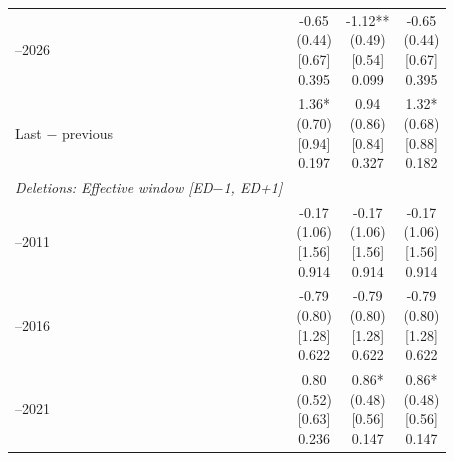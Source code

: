 \begin{threeparttable}
\begin{tabular}{@{}lccc}
\addlinespace[0.25ex]
\addlinespace[0.25ex]
2022–2026 & \makecell{-0.65\\(0.44)\\{}[0.67]\\{0.395}} & \makecell{-1.12**\\(0.49)\\{}[0.54]\\{0.099}} & \makecell{-0.65\\(0.44)\\{}[0.67]\\{0.395}} \\
\addlinespace[0.25ex]
\addlinespace[0.25ex]
Last $-$ previous & \makecell{1.36*\\(0.70)\\{}[0.94]\\{0.197}} & \makecell{0.94\\(0.86)\\{}[0.84]\\{0.327}} & \makecell{1.32*\\(0.68)\\{}[0.88]\\{0.182}} \\
\addlinespace[0.25ex]
\midrule
\emph{Deletions: Effective window [ED$-$1, ED+1]} \\
\addlinespace[0.25ex]
\addlinespace[1ex]
2007–2011 & \makecell{-0.17\\(1.06)\\{}[1.56]\\{0.914}} & \makecell{-0.17\\(1.06)\\{}[1.56]\\{0.914}} & \makecell{-0.17\\(1.06)\\{}[1.56]\\{0.914}} \\
\addlinespace[0.25ex]
\addlinespace[0.25ex]
2012–2016 & \makecell{-0.79\\(0.80)\\{}[1.28]\\{0.622}} & \makecell{-0.79\\(0.80)\\{}[1.28]\\{0.622}} & \makecell{-0.79\\(0.80)\\{}[1.28]\\{0.622}} \\
\addlinespace[0.25ex]
\addlinespace[0.25ex]
2017–2021 & \makecell{0.80\\(0.52)\\{}[0.63]\\{0.236}} & \makecell{0.86*\\(0.48)\\{}[0.56]\\{0.147}} & \makecell{0.86*\\(0.48)\\{}[0.56]\\{0.147}} \\

\end{tabular}
\end{threeparttable}
